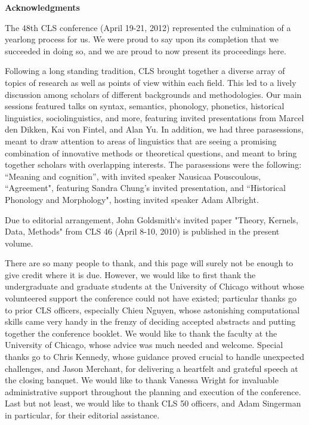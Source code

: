 \documentclass[12pt]{article}
\begin{document}
\begin{center}
{\selectfont \bfseries Acknowledgments}
\end{center}

\vspace{1em}

The 48th CLS conference (April 19-21, 2012) represented the culmination of a yearlong process for us. We were proud to say upon its completion that we succeeded in doing so, and we are proud to now present its proceedings here. 

Following a long standing tradition, CLS brought together a diverse array of topics of research as well as points of view within each field. This led to a lively discussion among scholars of different backgrounds and methodologies. Our main sessions featured talks on syntax, semantics, phonology, phonetics, historical linguistics, sociolinguistics, and more, featuring invited presentations from Marcel den Dikken, Kai von Fintel, and Alan Yu. In addition, we had three parasessions, meant to draw attention to areas of linguistics that are seeing a promising combination of innovative methods or theoretical questions, and meant to bring together scholars with overlapping interests.  The parasessions were the following: ``Meaning and cognition'', with invited speaker Nausicaa Pouscoulous, ``Agreement", featuring Sandra Chung's invited presentation, and ``Historical Phonology and Morphology", hosting invited speaker Adam Albright.  

Due to editorial arrangement, John Goldsmith`s invited paper "Theory, Kernels, Data, Methods" from CLS 46 (April 8-10, 2010) is published in the present volume.

There are so many people to thank, and this page will surely not be enough to give credit where it is due. However, we would like to first thank the undergraduate and graduate students at the University of Chicago without whose volunteered support the conference could not have existed; particular thanks go to prior CLS officers, especially Chieu Nguyen, whose astonishing computational skills came very handy in the frenzy of deciding accepted abstracts and putting together the conference booklet. We would like to thank the faculty at the University of Chicago, whose advice was much needed and welcome. Special thanks go to Chris Kennedy, whose guidance proved crucial to handle unexpected challenges, and Jason Merchant, for delivering a heartfelt and grateful speech at the closing banquet. We would like to thank Vanessa Wright for invaluable administrative support throughout the planning and execution of the conference. Last but not least, we would like to thank CLS 50 officers, and Adam Singerman in particular, for their editorial assistance.
\end{document}
